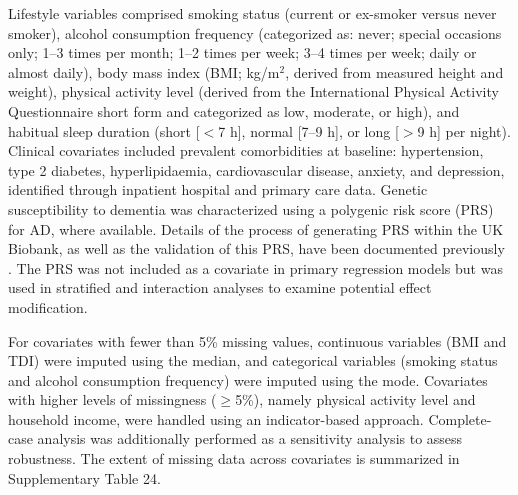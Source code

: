 \documentclass{article}
\begin{document}
Lifestyle variables comprised smoking status (current or ex-smoker versus never smoker), alcohol consumption frequency (categorized as: never; special occasions only; 1--3 times per month; 1--2 times per week; 3--4 times per week; daily or almost daily), body mass index (BMI; kg/m$^{2}$, derived from measured height and weight), physical activity level (derived from the International Physical Activity Questionnaire short form and categorized as low, moderate, or high), and habitual sleep duration (short [$<$7 h], normal [7--9 h], or long [$>$9 h] per night). Clinical covariates included prevalent comorbidities at baseline: hypertension, type 2 diabetes, hyperlipidaemia, cardiovascular disease, anxiety, and depression, identified through inpatient hospital and primary care data. Genetic susceptibility to dementia was characterized using a polygenic risk score (PRS) for AD, where available. Details of the process of generating PRS within the UK Biobank, as well as the validation of this PRS, have been documented previously \cite{bycroft2018uk, sun2024intrinsic}. The PRS was not included as a covariate in primary regression models but was used in stratified and interaction analyses to examine potential effect modification.

For covariates with fewer than 5\% missing values, continuous variables (BMI and TDI) were imputed using the median, and categorical variables (smoking status and alcohol consumption frequency) were imputed using the mode. Covariates with higher levels of missingness ($\geq$5\%), namely physical activity level and household income, were handled using an indicator-based approach. Complete-case analysis was additionally performed as a sensitivity analysis to assess robustness. The extent of missing data across covariates is summarized in Supplementary Table 24.
\end{document}

